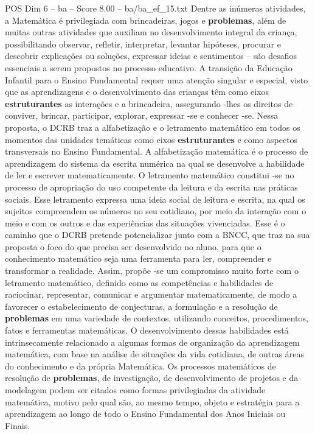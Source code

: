 \begin{textsample}{POS Dim 6 – ba – Score 8.00 – ba/ba\_ef\_15.txt}
Dentre as inúmeras atividades, a Matemática é privilegiada com brincadeiras, jogos e \textbf{problemas}, além de muitas outras atividades que auxiliam no desenvolvimento integral da criança, possibilitando observar, refletir, interpretar, levantar hipóteses, procurar e descobrir explicações ou soluções, expressar ideias e sentimentos – são desafios essenciais a serem propostos no processo educativo.
A transição da Educação Infantil para o Ensino Fundamental requer uma atenção singular e especial, visto que as aprendizagens e o desenvolvimento das crianças têm como eixos \textbf{estruturantes} as interações e a brincadeira, assegurando -lhes os direitos de conviver, brincar, participar, explorar, expressar -se e conhecer -se.
Nessa proposta, o DCRB traz a alfabetização e o letramento matemático em todos os momentos das unidades temáticas como eixos \textbf{estruturantes} e como aspectos transversais no Ensino Fundamental.
A alfabetização matemática é o processo de aprendizagem do sistema da escrita numérica na qual se desenvolve a habilidade de ler e escrever matematicamente.
O letramento matemático constitui -se no processo de apropriação do uso competente da leitura e da escrita nas práticas sociais.
Esse letramento expressa uma ideia social de leitura e escrita, na qual os sujeitos compreendem os números no seu cotidiano, por meio da interação com o meio e com os outros e das experiências das situações vivenciadas.
Esse é o caminho que o DCRB pretende potencializar junto com a BNCC, que traz na sua proposta o foco do que precisa ser desenvolvido no aluno, para que o conhecimento matemático seja uma ferramenta para ler, compreender e transformar a realidade.
Assim, propõe -se um compromisso muito forte com o letramento matemático, definido como as competências e habilidades de raciocinar, representar, comunicar e argumentar matematicamente, de modo a favorecer o estabelecimento de conjecturas, a formulação e a resolução de \textbf{problemas} em uma variedade de contextos, utilizando conceitos, procedimentos, fatos e ferramentas matemáticas.
O desenvolvimento dessas habilidades está intrinsecamente relacionado a algumas formas de organização da aprendizagem matemática, com base na análise de situações da vida cotidiana, de outras áreas do conhecimento e da própria Matemática.
Os processos matemáticos de resolução de \textbf{problemas}, de investigação, de desenvolvimento de projetos e da modelagem podem ser citados como formas privilegiadas da atividade matemática, motivo pelo qual são, ao mesmo tempo, objeto e estratégia para a aprendizagem ao longo de todo o Ensino Fundamental dos Anos Iniciais ou Finais.

\end{textsample}
